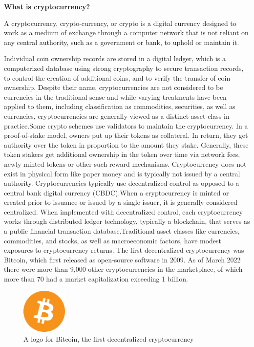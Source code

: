 \textbf{What is cryptocurrency?}

A cryptocurrency, crypto-currency, or crypto is a digital currency designed to work as a medium of exchange through a computer network that is not reliant on any central authority, such as a government or bank, to uphold or maintain it.

Individual coin ownership records are stored in a digital ledger, which is a computerized database using strong cryptography to secure transaction records, to control the creation of additional coins, and to verify the transfer of coin ownership. Despite their name, cryptocurrencies are not considered to be currencies in the traditional sense and while varying treatments have been applied to them, including classification as commodities, securities, as well as currencies, cryptocurrencies are generally viewed as a distinct asset class in practice.Some crypto schemes use validators to maintain the cryptocurrency. In a proof-of-stake model, owners put up their tokens as collateral. In return, they get authority over the token in proportion to the amount they stake. Generally, these token stakers get additional ownership in the token over time via network fees, newly minted tokens or other such reward mechanisms.
Cryptocurrency does not exist in physical form like paper money and is typically not issued by a central authority. Cryptocurrencies typically use decentralized control as opposed to a central bank digital currency (CBDC).When a cryptocurrency is minted or created prior to issuance or issued by a single issuer, it is generally considered centralized. When implemented with decentralized control, each cryptocurrency works through distributed ledger technology, typically a blockchain, that serves as a public financial transaction database.Traditional asset classes like currencies, commodities, and stocks, as well as macroeconomic factors, have modest exposures to cryptocurrency returns.
The first decentralized cryptocurrency was Bitcoin, which first released as open-source software in 2009. As of March 2022 there were more than 9,000 other cryptocurrencies in the marketplace, of which more than 70 had a market capitalization exceeding 1 billion.

\begin{figure}[H]
\centering
\includegraphics[width=0.2\textwidth]{images/btclogo.png}
\caption{A logo for Bitcoin, the first decentralized cryptocurrency}
\label{fig:bitcoin}
\end{figure}

